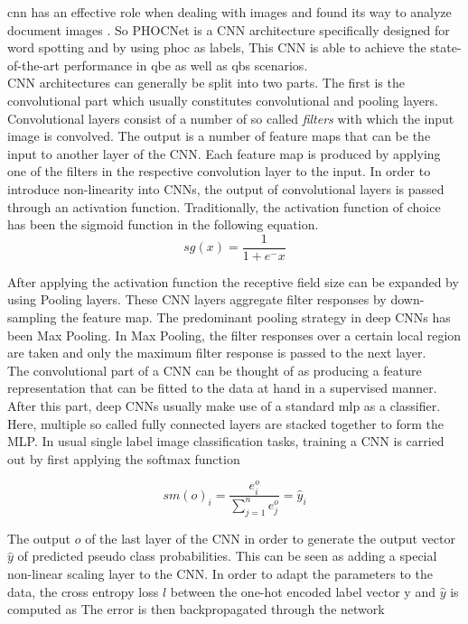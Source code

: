 \acrfull{cnn} has an effective role when dealing with images and found its way to analyze document images \cite{PHOCNET}. So PHOCNet is a CNN architecture specifically designed for word spotting and by using \acrshort{phoc} as labels, This CNN is able to achieve the state-of-the-art performance in \acrfull{qbe} as well as \acrfull{qbs} scenarios.\\

CNN architectures can generally be split into two parts. The first is the convolutional part which usually constitutes convolutional and pooling layers. Convolutional layers consist of a number of so called \emph{filters} with which the input image is convolved. The output is a number of feature maps that can be the input to another layer of the CNN. Each feature map is produced by applying one of the filters in the respective convolution layer to the input. In order to introduce non-linearity into CNNs, the output of convolutional layers is passed through an activation function. Traditionally, the activation function of choice has been the sigmoid function in the following equation.
\begin{equation}
    sg(x) = \frac{1}{1 + e^-x}
    \label{equ:sigmoid}
\end{equation}

After applying the activation function the receptive field size can be expanded by using Pooling layers. These CNN layers aggregate filter responses by down-sampling the feature map. The predominant pooling strategy in deep CNNs has been Max Pooling. In Max Pooling, the filter responses over a certain local region are taken and only the maximum filter response is passed
to the next layer. \\
The convolutional part of a CNN can be thought of as producing a feature representation that can be fitted to the data at hand in a supervised manner. After this part, deep CNNs usually make use of a standard \acrfull{mlp} as a classifier. Here, multiple so called fully connected layers are stacked together to form the MLP. In usual single label image classification tasks, training a CNN is carried out by first applying the softmax function

\begin{equation}
    sm(o)_i = \frac{e^o_i}{\sum_{j=1}^n e^o_j} = \hat y_i
\end{equation}

The output $o$ of the last layer of the CNN in order to generate
the output vector $\hat y$ of predicted pseudo class probabilities. This can be seen as adding a special non-linear scaling layer to the CNN. In order to adapt the parameters to the data, the cross entropy loss $l$ between the one-hot encoded label vector y and $\hat y$ is computed as The error is then backpropagated through the network \\

